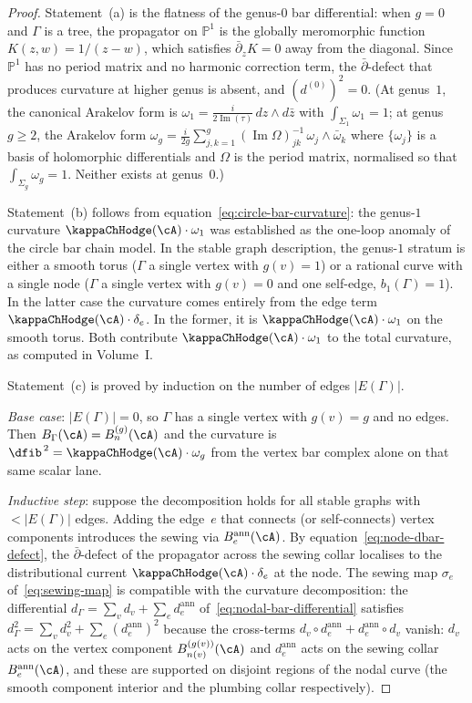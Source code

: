 \begin{proof}
Statement~(a) is the flatness of the genus-$0$ bar differential:
when $g = 0$ and $\Gamma$ is a tree, the propagator on
$\mathbb{P}^1$ is the globally meromorphic function
$K(z,w) = 1/(z-w)$, which satisfies $\bar\partial_z K = 0$
away from the diagonal. Since $\mathbb{P}^1$ has no period
matrix and no harmonic correction term, the
$\bar\partial$-defect that produces curvature at higher genus
is absent, and $(d^{(0)})^2 = 0$.
(At genus~$1$, the canonical Arakelov form is
$\omega_1 = \frac{i}{2\operatorname{Im}(\tau)}\,
dz\wedge d\bar{z}$ with $\int_{\Sigma_1}\omega_1 = 1$;
at genus $g\ge 2$, the Arakelov form
$\omega_g = \frac{i}{2g}\sum_{j,k=1}^g
(\operatorname{Im}\Omega)^{-1}_{jk}\,
\omega_j\wedge\bar\omega_k$
where $\{\omega_j\}$ is a basis of holomorphic
differentials and $\Omega$ is the period matrix,
normalised so that $\int_{\Sigma_g}\omega_g = 1$.
Neither exists at genus~$0$.)

Statement~(b) follows from
equation~\eqref{eq:circle-bar-curvature}: the genus-$1$ curvature
$\kappaChHodge(\cA)\cdot\omega_1$ was established as the one-loop anomaly
of the circle bar chain model. In the stable graph description,
the genus-$1$ stratum is either a smooth torus ($\Gamma$ a single
vertex with $g(v) = 1$) or a rational curve with a single node
($\Gamma$ a single vertex with $g(v) = 0$ and one self-edge,
$b_1(\Gamma) = 1$). In the latter case the curvature comes
entirely from the edge term $\kappaChHodge(\cA)\cdot\delta_e$. In the
former, it is $\kappaChHodge(\cA)\cdot\omega_1$ on the smooth torus.
Both contribute $\kappaChHodge(\cA)\cdot\omega_1$ to the total
curvature, as computed in Volume~I.

Statement~(c) is proved by induction on the number of edges
$|E(\Gamma)|$.

\emph{Base case}: $|E(\Gamma)|=0$, so $\Gamma$ has a single
vertex with $g(v) = g$ and no edges. Then
$B_\Gamma(\cA) = B^{(g)}_{n}(\cA)$ and the curvature is
$\dfib^{\,2} = \kappaChHodge(\cA)\cdot\omega_g$ from the vertex bar
complex alone on that same scalar lane.

\emph{Inductive step}: suppose the decomposition holds for all
stable graphs with $<|E(\Gamma)|$ edges. Adding the edge~$e$
that connects (or self-connects) vertex components introduces
the sewing via $B^{\mathrm{ann}}_e(\cA)$. By
equation~\eqref{eq:node-dbar-defect}, the
$\bar\partial$-defect of the propagator across the sewing
collar localises to the distributional current
$\kappaChHodge(\cA)\cdot\delta_e$ at the node. The sewing map
$\sigma_e$ of~\eqref{eq:sewing-map} is compatible with the
curvature decomposition: the differential
$d_\Gamma = \sum_v d_v + \sum_e d^{\mathrm{ann}}_e$
of~\eqref{eq:nodal-bar-differential} satisfies
$d_\Gamma^2 = \sum_v d_v^2 + \sum_e (d^{\mathrm{ann}}_e)^2$
because the cross-terms $d_v\circ d^{\mathrm{ann}}_e
+ d^{\mathrm{ann}}_e\circ d_v$ vanish: $d_v$ acts on the
vertex component $B^{(g(v))}_{n(v)}(\cA)$ and
$d^{\mathrm{ann}}_e$ acts on the sewing collar
$B^{\mathrm{ann}}_e(\cA)$, and these are supported on
disjoint regions of the nodal curve (the smooth component
interior and the plumbing collar respectively).


\end{proof}
